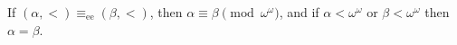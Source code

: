 If $(\alpha, <) \equiv_{\mathrm{ee}} (\beta, <)$, then $\alpha \equiv \beta \pmod{\omega^\omega}$, and if $\alpha < \omega^\omega$ or $\beta < \omega^\omega$ then $\alpha = \beta$.
